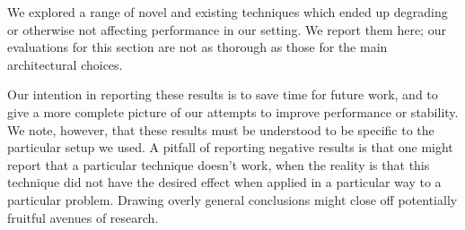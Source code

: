 We explored a range of novel and existing techniques which ended up degrading or otherwise not affecting performance in our setting. We report them here; our evaluations for this section are not as thorough as those for the main architectural choices. 

Our intention in reporting these results is to save time for future work, and to give a more complete picture of our attempts to improve performance or stability. We note, however, that these results must be understood to be specific to the particular setup we used. A pitfall of reporting negative results is that one might report that a particular technique doesn't work, when the reality is that this technique did not have the desired effect when applied in a particular way to a particular problem. Drawing overly general conclusions might close off potentially fruitful avenues of research.

